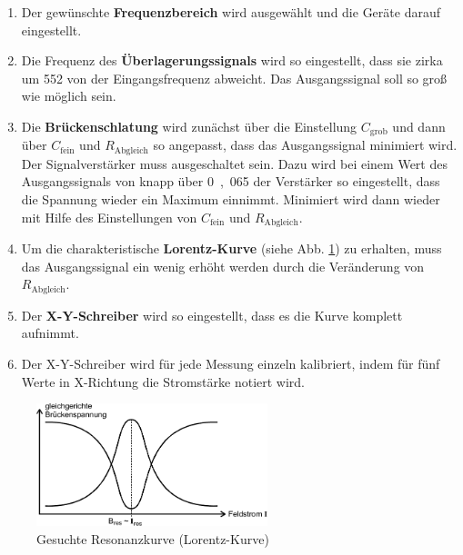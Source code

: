 \begin{enumerate}
	
\item{Der gewünschte \textbf{Frequenzbereich} wird ausgewählt und die Geräte darauf eingestellt.}

\item{Die Frequenz des \textbf{Überlagerungssignals} wird so eingestellt, dass sie zirka um \si{552}{\kilo\hertz} von der Eingangsfrequenz abweicht. Das Ausgangssignal soll so groß wie möglich sein.}

\item{Die \textbf{Brückenschlatung} wird zunächst über die Einstellung $C_\textrm{grob}$ und dann über $C_\textrm{fein}$ und $R_\textrm{Abgleich}$ so angepasst, dass das Ausgangssignal minimiert wird. Der Signalverstärker muss ausgeschaltet sein. Dazu wird bei einem Wert des Ausgangssignals von knapp über \si{0,065}{\volt}  der Verstärker so eingestellt, dass die Spannung wieder ein Maximum einnimmt. Minimiert wird dann wieder mit Hilfe des Einstellungen von $C_\textrm{fein}$ und $R_{\textrm{Abgleich}}$.}

\item{Um die charakteristische \textbf{Lorentz-Kurve} (siehe Abb. \ref{fig:kurve}) zu erhalten, muss das Ausgangssignal ein wenig erhöht werden durch die Veränderung von $R_\textrm{Abgleich}$.}

\item{Der \textbf{X-Y-Schreiber} wird so eingestellt, dass es die Kurve komplett aufnimmt.}
\item{Der X-Y-Schreiber wird für jede Messung einzeln kalibriert, indem für fünf Werte in X-Richtung die Stromstärke notiert wird.}

\end{enumerate}


\begin{figure}[h!]
	\centering
	\includegraphics[width=0.6\textwidth]{Anleitung_Abb10.pdf}
	\caption[Resonanzkurve]{Gesuchte Resonanzkurve (Lorentz-Kurve) \cite{V28}}
	\label{fig:kurve}
\end{figure}
